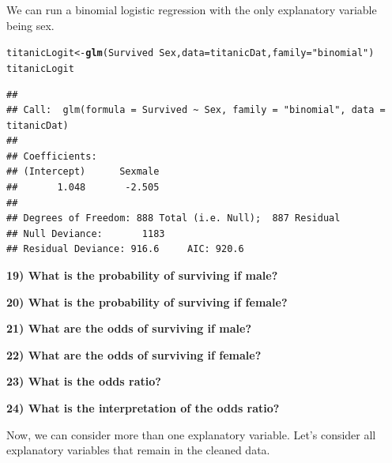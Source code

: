 \documentclass{article}\usepackage[]{graphicx}\usepackage[]{color}
\makeatletter
\newcommand{\hlstr}[1]{\textcolor[rgb]{0.192,0.494,0.8}{#1}}%
\newcommand{\hlopt}[1]{\textcolor[rgb]{0,0,0}{#1}}%
\newcommand{\hlstd}[1]{\textcolor[rgb]{0.345,0.345,0.345}{#1}}%
\newcommand{\hlkwb}[1]{\textcolor[rgb]{0.69,0.353,0.396}{#1}}%
\newcommand{\hlkwc}[1]{\textcolor[rgb]{0.333,0.667,0.333}{#1}}%
\newcommand{\hlkwd}[1]{\textcolor[rgb]{0.737,0.353,0.396}{\textbf{#1}}}%
\newenvironment{kframe}{%
 \def\at@end@of@kframe{}%
 \ifinner\ifhmode%
  \def\at@end@of@kframe{\end{minipage}}%
  \begin{minipage}{\columnwidth}%
 \fi\fi%
 \def\FrameCommand##1{\hskip\@totalleftmargin \hskip-\fboxsep
 \colorbox{shadecolor}{##1}\hskip-\fboxsep
     \hskip-\linewidth \hskip-\@totalleftmargin \hskip\columnwidth}%
 \MakeFramed {\advance\hsize-\width
   \@totalleftmargin\z@ \linewidth\hsize
   \@setminipage}}%
 {\par\unskip\endMakeFramed%
 \at@end@of@kframe}
\newenvironment{knitrout}{}{} %
\makeatother
\begin{document}
We can run a binomial logistic regression with the only explanatory variable being sex.

\begin{knitrout}
\color{fgcolor}\begin{kframe}
\begin{alltt}
\hlstd{titanicLogit} \hlkwb{<-} \hlkwd{glm}\hlstd{(Survived} \hlopt{~} \hlstd{Sex,} \hlkwc{data} \hlstd{= titanicDat,} \hlkwc{family} \hlstd{=} \hlstr{"binomial"}\hlstd{)}
\hlstd{titanicLogit}
\end{alltt}
\begin{verbatim}
## 
## Call:  glm(formula = Survived ~ Sex, family = "binomial", data = titanicDat)
## 
## Coefficients:
## (Intercept)      Sexmale  
##       1.048       -2.505  
## 
## Degrees of Freedom: 888 Total (i.e. Null);  887 Residual
## Null Deviance:	    1183 
## Residual Deviance: 916.6 	AIC: 920.6
\end{verbatim}
\end{kframe}
\end{knitrout}

\vspace{5mm}

\textbf{19) What is the probability of surviving if male?}

\vspace{20mm}

\textbf{20) What is the probability of surviving if female?}

\vspace{20mm}

\textbf{21) What are the odds of surviving if male?}

\vspace{20mm}

\textbf{22) What are the odds of surviving if female?}

\vspace{20mm}

\textbf{23) What is the odds ratio?}

\vspace{20mm}

\textbf{24) What is the interpretation of the odds ratio?}

\newpage

Now, we can consider more than one explanatory variable. Let's consider all explanatory variables that remain in the cleaned data.
\end{document}
